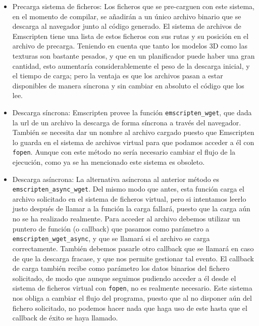 \begin{itemize}
    \item Precarga sistema de ficheros: Los ficheros que se pre-carguen con este sistema, en el momento de compilar, se añadirán a un único archivo binario que se descarga al navegador junto al código generado. El sistema de archivos de Emscripten tiene una lista de estos ficheros con sus rutas y su posición en el archivo de precarga. Teniendo en cuenta que tanto los modelos 3D como las texturas son bastante pesados, y que en un planificador puede haber una gran cantidad, esto aumentaría considerablemente el peso de la descarga inicial, y el tiempo de carga; pero la ventaja es que los archivos pasan a estar disponibles de manera síncrona y sin cambiar en absoluto el código que los lee.
    
    \item Descarga síncrona: Emscripten provee la función \texttt{emscripten\_wget}, que dada la url de un archivo la descarga de forma síncrona a través del navegador. También se necesita dar un nombre al archivo cargado puesto que Emscripten lo guarda en el sistema de archivos virtual para que podamos acceder a él con \texttt{fopen}. Aunque con este método no sería necesario cambiar el flujo de la ejecución, como ya se ha mencionado este sistema es obsoleto.
    
    \item Descarga asíncrona: La alternativa asíncrona al anterior método es \texttt{emscripten\_async\_wget}. Del mismo modo que antes, esta función carga el archivo solicitado en el sistema de ficheros virtual, pero si intentamos leerlo justo después de llamar a la función la carga fallará, puesto que la carga aún no se ha realizado realmente. Para acceder al archivo debemos utilizar un puntero de función (o callback) que pasamos como parámetro a \texttt{emscripten\_wget\_async}, y que se llamará si el archivo se carga correctamente. También debemos pasarle otro callback que se llamará en caso de que la descarga fracase, y que nos permite gestionar tal evento. El callback de carga también recibe como parámetro los datos binarios del fichero solicitado, de modo que aunque seguimos pudiendo acceder a él desde el sistema de ficheros virtual con \texttt{fopen}, no es realmente necesario. Este sistema nos obliga a cambiar el flujo del programa, puesto que al no disponer aún del fichero solicitado, no podemos hacer nada que haga uso de este hasta que el callback de éxito se haya llamado.
\end{itemize}

